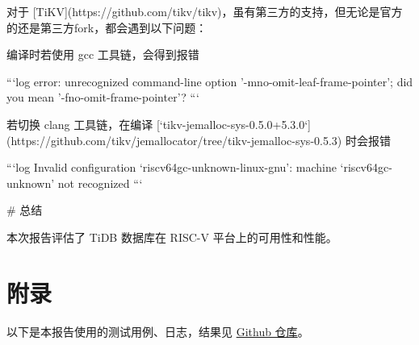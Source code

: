 \documentclass{article}
\begin{document}
\begin{markdown}
对于 [TiKV](https://github.com/tikv/tikv)，虽有第三方的支持，但无论是官方的还是第三方fork，都会遇到以下问题：

编译时若使用 gcc 工具链，会得到报错

```log
error: unrecognized command-line option '-mno-omit-leaf-frame-pointer'; did you mean '-fno-omit-frame-pointer'?
```

若切换 clang 工具链，在编译 [`tikv-jemalloc-sys-0.5.0+5.3.0`](https://github.com/tikv/jemallocator/tree/tikv-jemalloc-sys-0.5.3) 时会报错

```log
Invalid configuration `riscv64gc-unknown-linux-gnu': machine `riscv64gc-unknown' not recognized
```

# 总结

本次报告评估了 TiDB 数据库在 RISC-V 平台上的可用性和性能。

\end{markdown}

\newpage
\section{附录}

\appendix

以下是本报告使用的测试用例、日志，结果见 \href{https://github.com/QA-Team-lo/dbtest}{Github 仓库}。


\end{document}
